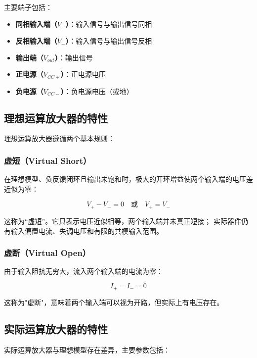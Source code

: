主要端子包括：
\begin{itemize}
  \item \textbf{同相输入端（$V_+$）}：输入信号与输出信号同相
  \item \textbf{反相输入端（$V_-$）}：输入信号与输出信号反相
  \item \textbf{输出端（$V_{out}$）}：输出信号
  \item \textbf{正电源（$V_{CC+}$）}：正电源电压
  \item \textbf{负电源（$V_{CC-}$）}：负电源电压（或地）
\end{itemize}

\subsection{理想运算放大器的特性}

理想运算放大器遵循两个基本规则：

\subsubsection{虚短（Virtual Short）}

在理想模型、负反馈闭环且输出未饱和时，极大的开环增益使两个输入端的电压差近似为零：

\begin{equation}
V_+ - V_- = 0 \quad \text{或} \quad V_+ = V_- \label{eq:virtual-short}
\end{equation}

这称为“虚短”。它只表示电压近似相等，两个输入端并未真正短接；
实际器件仍有输入偏置电流、失调电压和有限的共模输入范围。

\subsubsection{虚断（Virtual Open）}

由于输入阻抗无穷大，流入两个输入端的电流为零：

\begin{equation}
I_+ = I_- = 0 \label{eq:virtual-open}
\end{equation}

这称为"虚断"，意味着两个输入端可以视为开路，但实际上有电压存在。

\subsection{实际运算放大器的特性}

实际运算放大器与理想模型存在差异，主要参数包括：

